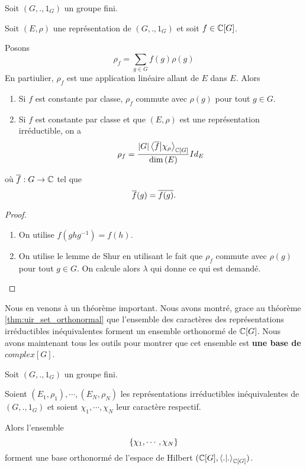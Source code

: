 \begin{proposition}
	Soit $(G, ., 1_{G})$ un groupe fini.

	Soit $(E, \rho)$ une représentation de $(G, ., 1_{G})$ et soit $f \in
	\mathbb{C}[G]$.

	Posons
	\begin{equation}
		\rho_{f} = \sum_{g \in G} f(g) \rho(g)
	\end{equation}
	En partiulier, $\rho_{f}$ est une application linéaire allant de $E$ dans
	$E$.
	Alors
	\begin{enumerate}
		\item Si $f$ est constante par classe, $\rho_{f}$ commute avec $\rho(g)$
			pour tout $g \in G$.
		\item Si $f$ est constante par classe et que $(E, \rho)$ est une
			représentation irréductible, on a
			\begin{equation}
				\rho_{f} = \frac{|G|
				\bra{\overline{f}}\ket{\chi_{\rho}}_{\mathbb{C}[G]}}{\dim{(E)}}
				Id_{E}
			\end{equation}
	\end{enumerate}
	où $\overline{f} : G \rightarrow \mathbb{C}$ tel que
	\begin{equation}
		\overline{f}(g) = \overline{f(g)}.
	\end{equation}
\end{proposition}

\ifdefined\outputproof
\begin{proof}
	\begin{enumerate}
		\item On utilise $f(ghg^{-1}) = f(h)$.
		\item On utilise le lemme de Shur en utilisant le fait que $\rho_{f}$
			commute avec $\rho(g)$ pour tout $g \in G$.
			On calcule alors $\lambda$ qui donne ce qui est demandé.
	\end{enumerate}
\end{proof}
\fi

Nous en venons à un théorème important. Nous avons montré, grace au théorème
\ref{thm:uir_set_orthonormal} que l'ensemble des caractères des représentations
irréductibles inéquivalentes forment un ensemble orthonormé de $\mathbb{C}[G]$.
Nous avons maintenant tous les outils pour montrer que cet ensemble est
\textbf{une base de $complex[G]$}.

\begin{theorem}
	\label{uir:uir_set_basis}
	Soit $(G, ., 1_{G})$ un groupe fini.

	Soient $(E_{1}, \rho_{1}), \cdots, (E_{N}, \rho_{N})$ les représentations
	irréductibles inéquivalentes de $(G, ., 1_{G})$ et soient $\chi_{1}, \cdots,
	\chi_{N}$ leur caractère respectif.

	Alors l'ensemble
	\begin{equation}
		\left\{ \chi_{1}, \cdots, \chi_{N} \right\}
	\end{equation}
	forment une base orthonormé de l'espace de Hilbert $(\mathbb{C}[G],
	\bra{.}\ket{.}_{\mathbb{C}[G]})$.
\end{theorem}

